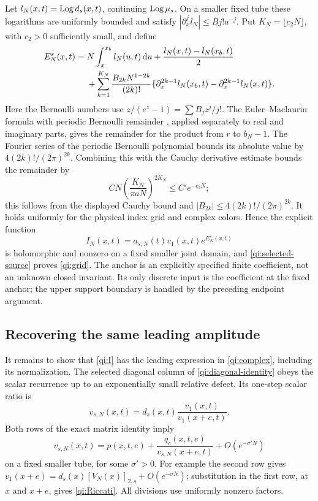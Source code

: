 Let $l_N(x,t)=\operatorname{Log} d_s(x,t)$, continuing $\operatorname{Log}\mu_s$. On a smaller fixed tube these logarithms are uniformly bounded and satisfy
$|\partial_x^j l_N|\le B j! a^{-j}$. Put $K_N=\lfloor c_2N\rfloor$, with $c_2>0$ sufficiently small, and define
\begin{align}
 E_N^s(x,t)={}&N\int_x^{x_b}l_N(u,t)\,\mathrm d u
       +\frac{l_N(x,t)-l_N(x_b,t)}2\notag\\
 &+\sum_{k=1}^{K_N}\frac{B_{2k}N^{1-2k}}{(2k)!}
 \{\partial_x^{2k-1}l_N(x_b,t)
                 -\partial_x^{2k-1}l_N(x,t)\}.
 \label{qi:EM}
\end{align}
Here the Bernoulli numbers use $z/(e^z-1)=\sum B_jz^j/j!$.
The Euler--Maclaurin formula with periodic Bernoulli remainder
\cite[equation (2.10.1)]{DLMF}, applied separately to real and imaginary parts, gives the remainder for the product from $r$ to $b_N-1$. The Fourier series of the periodic Bernoulli polynomial
\cite[equation (24.8.1)]{DLMF} bounds its absolute value by
$4(2k)!/(2\pi)^{2k}$. Combining this with the Cauchy derivative estimate bounds the remainder by
\[
 CN\left(\frac{K_N}{\pi aN}\right)^{2K_N}\le C'e^{-c_3N};
\]
this follows from the displayed Cauchy bound and
$|B_{2k}|\le4(2k)!/(2\pi)^{2k}$.
It holds uniformly for the physical index grid and complex colors. Hence the explicit function
\begin{equation}\label{qi:I}
 I_N(x,t)=a_{s,N}(t)v_1(x,t)e^{E_N^s(x,t)}
\end{equation}
is holomorphic and nonzero on a fixed smaller joint domain, and
\eqref{qi:selected-source} proves \eqref{qi:grid}.
The anchor is an explicitly specified finite coefficient, not an unknown closed invariant. Its only discrete input is the coefficient at the fixed anchor; the
upper support boundary is handled by the preceding endpoint argument.

\subsection{Recovering the same leading amplitude}

It remains to show that \eqref{qi:I} has the leading expression in
\eqref{qi:complex}, including its normalization. The selected diagonal column of \eqref{qi:diagonal-identity} obeys the scalar recurrence up to an exponentially small relative defect. Its one-step scalar ratio is
\[
 v_{s,N}(x,t)=d_s(x,t)\frac{v_1(x,t)}{v_1(x+e,t)}.
\]
Both rows of the exact matrix identity imply
\begin{equation}\label{qi:Riccati}
 v_{s,N}(x,t)
 =p(x,t,e)+\frac{q_c(x,t,e)}{v_{s,N}(x+e,t)}
                        +O(e^{-\sigma' N})
\end{equation}
on a fixed smaller tube, for some $\sigma'>0$.
For example the second row gives
$v_1(x+e)=d_s(x)[V_N(x)]_{2,s}+O(e^{-\sigma N})$;
substitution in the first row, at $x$ and $x+e$, gives
\eqref{qi:Riccati}. All divisions use uniformly nonzero factors.

